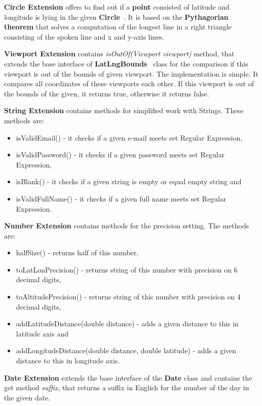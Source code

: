 \textbf{Circle Extension} offers to find out if a \textbf{point} consisted of latitude and longitude is lying in the given \textbf{Circle}~\cite{googleMapsCircles}.
It is based on the \textbf{Pythagorian theorem} that solves a computation of the longest line in a right triangle consisting of the spoken line and x and y-axis lines.

\textbf{Viewport Extension} contains \textit{isOutOf(Viewport viewport)} method, that extends the base interface of \textbf{LatLngBounds}~\cite{latLngBounds} class for the comparison if this viewport is out of the bounds of given viewport.
The implementation is simple.
It compares all coordinates of these viewports each other.
If this viewport is out of the bounds of the given, it returns true, otherwise it returns false.

\textbf{String Extension} contains methods for simplified work with Strings.
These methods are:
\begin{itemize}
    \item isValidEmail() - it checks if a given e-mail meets set Regular Expression,
    \item isValidPassword() - it checks if a given password meets set Regular Expression,
    \item isBlank() - it checks if a given string is empty or equal empty string and
    \item isValidFullName() - it checks if a given full name meets set Regular Expression.
\end{itemize}

\textbf{Number Extension} contains methods for the precision setting.
The methods are:
\begin{itemize}
    \item halfSize() - returns half of this number,
    \item toLatLonPrecision() - returns string of this number with precision on 6 decimal digits,
    \item toAltitudePrecision() - returns string of this number with precision on 4 decimal digits,
    \item addLatitudeDistance(double distance) - adds a given distance to this in latitude axis and
    \item addLongitudeDistance(double distance, double latitude) - adds a given distance to this in longitude axis.
\end{itemize}

\textbf{Date Extension} extends the base interface of the \textbf{Date} class and contains the get method \textit{suffix}, that returns a suffix in English for the number of the day in the given date.

